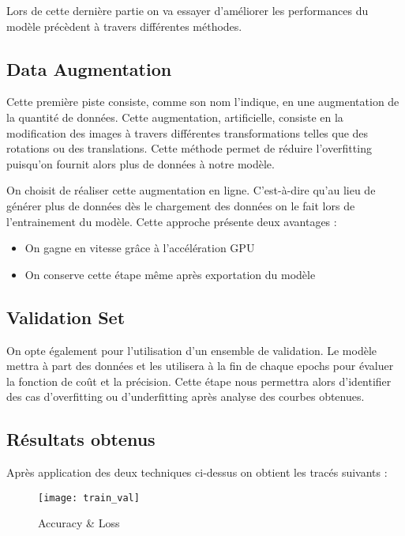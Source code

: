 \documentclass[12pt,a4paper,titlepage]{article}
\begin{document}
Lors de cette dernière partie on va essayer d'améliorer les performances
du modèle précèdent à travers différentes méthodes.

\subsection{Data Augmentation}

Cette première piste consiste, comme son nom l'indique, en  une
augmentation de la quantité de données. Cette augmentation, artificielle,
consiste en la modification des images à travers différentes transformations
telles que des rotations ou des translations. Cette méthode permet de
réduire l'overfitting puisqu'on fournit alors plus de données à notre
modèle.

On choisit de réaliser cette augmentation en ligne. C'est-à-dire qu'au lieu
de générer plus de données dès le chargement des données on le fait lors de l'entrainement
du modèle. Cette approche présente deux avantages :

\begin{itemize}
    \item{On gagne en vitesse grâce à l'accélération GPU}
    \item{On conserve cette étape même après exportation du modèle}
\end{itemize}

\subsection{Validation Set}

On opte également pour l'utilisation d'un ensemble de validation. Le modèle mettra à part des
données et les utilisera à la fin de chaque epochs pour évaluer la fonction de coût et la
précision. Cette étape nous permettra alors d'identifier des cas d'overfitting ou d'underfitting
après analyse des courbes obtenues.

\subsection{Résultats obtenus}

Après application des deux techniques ci-dessus on obtient les tracés suivants :

    \begin{figure}[H]
        \caption{Accuracy \& Loss}
        \texttt{[image: train\_val]}
        \centering
    \end{figure}
\end{document}
